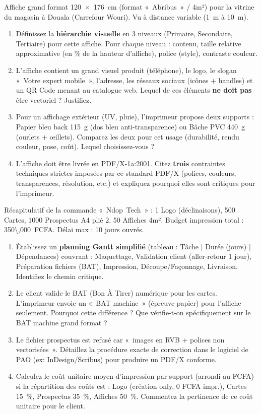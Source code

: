 \documentclass[11pt]{article}
\begin{document}
\begin{exercice}
Affiche grand format \SI{120 x 176}{cm} (format « Abribus » / 4m²) pour la vitrine du magasin à Douala (Carrefour Wouri). Vu à distance variable (\SI{1}{m} à \SI{10}{m}).
\begin{enumerate}
    \item Définissez la \textbf{hiérarchie visuelle} en 3 niveaux (Primaire, Secondaire, Tertiaire) pour cette affiche. Pour chaque niveau : contenu, taille relative approximative (en \% de la hauteur d'affiche), police (style), contraste couleur.
    \item L'affiche contient un grand visuel produit (téléphone), le logo, le slogan « Votre expert mobile », l'adresse, les réseaux sociaux (icônes + handles) et un QR Code menant au catalogue web. Lequel de ces éléments \textbf{ne doit pas} être vectoriel ? Justifiez.
    \item Pour un affichage extérieur (UV, pluie), l'imprimeur propose deux supports : Papier bleu back \SI{115}{g} (dos bleu anti-transparence) ou Bâche PVC \SI{440}{g} (ourlets + œillets). Comparez les deux pour cet usage (durabilité, rendu couleur, pose, coût). Lequel choisissez-vous ?
    \item L'affiche doit être livrée en PDF/X-1a:2001. Citez \textbf{trois} contraintes techniques strictes imposées par ce standard PDF/X (polices, couleurs, transparences, résolution, etc.) et expliquez pourquoi elles sont critiques pour l'imprimeur.
\end{enumerate}
\end{exercice}

\begin{exercice}
Récapitulatif de la commande « Ndop Tech » : 1 Logo (déclinaisons), 500 Cartes, 1000 Prospectus A4 plié 2, 50 Affiches 4m². Budget impression total : \SI{350\,000}{FCFA}. Délai max : 10 jours ouvrés.
\begin{enumerate}
    \item Établissez un \textbf{planning Gantt simplifié} (tableau : Tâche | Durée (jours) | Dépendances) couvrant : Maquettage, Validation client (aller-retour 1 jour), Préparation fichiers (BAT), Impression, Découpe/Façonnage, Livraison. Identifiez le chemin critique.
    \item Le client valide le BAT (Bon À Tirer) numérique pour les cartes. L'imprimeur envoie un « BAT machine » (épreuve papier) pour l'affiche seulement. Pourquoi cette différence ? Que vérifie-t-on spécifiquement sur le BAT machine grand format ?
    \item Le fichier prospectus est refusé car « images en RVB + polices non vectorisées ». Détaillez la procédure exacte de correction dans le logiciel de PAO (ex: InDesign/Scribus) pour produire un PDF/X conforme.
    \item Calculez le coût unitaire moyen d'impression par support (arrondi au FCFA) si la répartition des coûts est : Logo (création only, 0 FCFA impr.), Cartes \SI{15}{\%}, Prospectus \SI{35}{\%}, Affiches \SI{50}{\%}. Commentez la pertinence de ce coût unitaire pour le client.
\end{enumerate}
\end{exercice}
\end{document}
